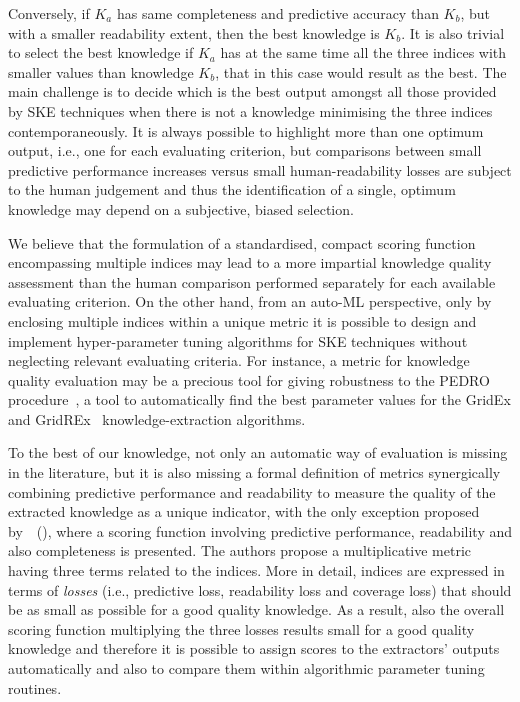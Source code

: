 \documentclass{article}
\newcommand{\citet}[1]{\citeauthor{#1}~(\citeyear{#1})}
\newcommand{\gridex}{GridEx}
\newcommand{\gridrex}{GridREx}
\newcommand{\pedro}{\textsc{PEDRO}}
\begin{document}
%
Conversely, if $K_a$ has same completeness and predictive accuracy than $K_b$, but with a smaller readability extent, then the best knowledge is $K_b$.
%
It is also trivial to select the best knowledge if $K_a$ has at the same time all the three indices with smaller values than knowledge $K_b$, that in this case would result as the best.
%
The main challenge is to decide which is the best output amongst all those provided by SKE techniques when there is not a knowledge minimising the three indices contemporaneously.
%
It is always possible to highlight more than one optimum output, i.e., one for each evaluating criterion, but comparisons between small predictive performance increases versus small human-readability losses are subject to the human judgement and thus the identification of a single, optimum knowledge may depend on a subjective, biased selection.

We believe that the formulation of a standardised, compact scoring function encompassing multiple indices may lead to a more impartial knowledge quality assessment than the human comparison performed separately for each available evaluating criterion.
%
On the other hand, from an auto-ML perspective, only by enclosing multiple indices within a unique metric it is possible to design and implement hyper-parameter tuning algorithms for SKE techniques without neglecting relevant evaluating criteria.
%
For instance, a metric for knowledge quality evaluation may be a precious tool for giving robustness to the \pedro{} procedure~\cite{gridrex-kr2022}, a tool to automatically find the best parameter values for the \gridex{} and \gridrex{}~\cite{gridex-extraamas2021,gridrex-kr2022} knowledge-extraction algorithms.

To the best of our knowledge, not only an automatic way of evaluation is missing in the literature, but it is also missing a formal definition of metrics synergically combining predictive performance and readability to measure the quality of the extracted knowledge as a unique indicator, with the only exception proposed by~\citet{skemetrics-aaai2023}, where a scoring function involving predictive performance, readability and also completeness is presented.
%
The authors propose a multiplicative metric having three terms related to the indices.
%
More in detail, indices are expressed in terms of \emph{losses} (i.e., predictive loss, readability loss and coverage loss) that should be as small as possible for a good quality knowledge.
%
As a result, also the overall scoring function multiplying the three losses results small for a good quality knowledge and therefore it is possible to assign scores to the extractors' outputs automatically and also to compare them within algorithmic parameter tuning routines.
\end{document}
